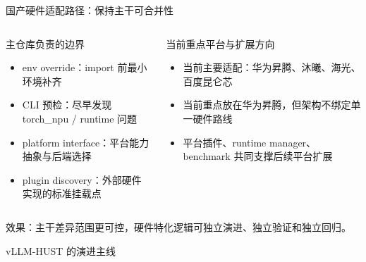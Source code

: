 \documentclass[aspectratio=169,11pt,fontset=none]{ctexbeamer}
\newcommand{\HuaweiAscend}{华为昇腾}
\begin{document}
\begin{frame}{国产硬件适配路径：保持主干可合并性}
  \begin{columns}[T]
    \begin{block}{主仓库负责的边界}
      \begin{itemize}
        \item env override：import 前最小环境补齐
        \item CLI 预检：尽早发现 torch\_npu / runtime 问题
        \item platform interface：平台能力抽象与后端选择
        \item plugin discovery：外部硬件实现的标准挂载点
      \end{itemize}
    \end{block}

    \begin{block}{当前重点平台与扩展方向}
      \begin{itemize}
        \item 当前主要适配：\HuaweiAscend、沐曦、海光、百度昆仑芯
        \item 当前重点放在\HuaweiAscend，但架构不绑定单一硬件路线
        \item 平台插件、runtime manager、benchmark 共同支撑后续平台扩展
      \end{itemize}
    \end{block}
  \end{columns}

  \vspace{0.5em}
  \centering
  \alert{效果：主干差异范围更可控，硬件特化逻辑可独立演进、独立验证和独立回归。}
\end{frame}

\begin{frame}{vLLM-HUST 的演进主线}
  \centering
  \resizebox{0.9\linewidth}{!}{}

\end{frame}
\end{document}

